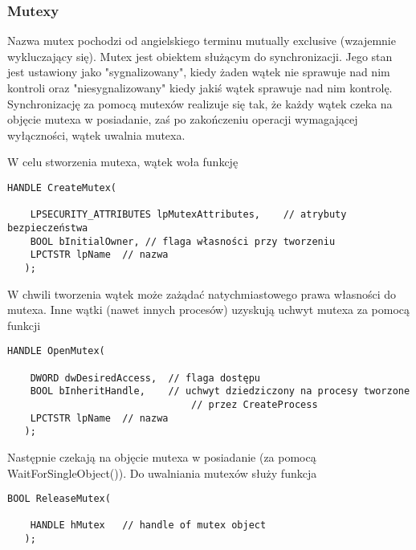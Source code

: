 \subsubsection{Mutexy}
\label{subsection_mutexy}

Nazwa mutex pochodzi od angielskiego terminu mutually exclusive (wzajemnie wykluczający się). 
Mutex jest obiektem służącym do synchronizacji. Jego stan jest ustawiony jako "sygnalizowany", 
kiedy żaden wątek nie sprawuje nad nim kontroli oraz "niesygnalizowany" kiedy jakiś wątek 
sprawuje nad nim kontrolę. Synchronizację za pomocą mutexów realizuje się tak, 
że każdy wątek czeka na objęcie mutexa w posiadanie, zaś po zakończeniu operacji 
wymagającej wyłączności, wątek uwalnia mutexa. 

W celu stworzenia mutexa, wątek woła funkcję 

\begin{scriptsize}
\begin{verbatim}
HANDLE CreateMutex(

    LPSECURITY_ATTRIBUTES lpMutexAttributes,	// atrybuty bezpieczeństwa
    BOOL bInitialOwner,	// flaga własności przy tworzeniu
    LPCTSTR lpName 	// nazwa
   );
\end{verbatim}
\end{scriptsize}

W chwili tworzenia wątek może zażądać natychmiastowego prawa własności do mutexa. 
Inne wątki (nawet innych procesów) uzyskują uchwyt mutexa za pomocą funkcji 

\begin{scriptsize}
\begin{verbatim}
HANDLE OpenMutex(

    DWORD dwDesiredAccess,	// flaga dostępu
    BOOL bInheritHandle,	// uchwyt dziedziczony na procesy tworzone
                                // przez CreateProcess
    LPCTSTR lpName 	// nazwa
   );
\end{verbatim}
\end{scriptsize}

Następnie czekają na objęcie mutexa w posiadanie (za pomocą WaitForSingleObject()). 
Do uwalniania mutexów służy funkcja 

\begin{scriptsize}
\begin{verbatim}
BOOL ReleaseMutex(

    HANDLE hMutex 	// handle of mutex object  
   );
\end{verbatim}
\end{scriptsize}

